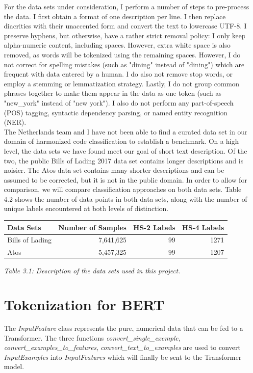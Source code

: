 For the data sets under consideration, I perform a number of steps to pre-process the data. I first obtain a format of one description per line. 
I then replace diacritics with their unaccented form and convert the text to lowercase UTF-8. I preserve hyphens, but otherwise, have a rather strict removal policy: I only keep alpha-numeric content, including spaces. However, extra white space is also removed, as words will be tokenized using the remaining spaces. However, I do not correct for spelling mistakes (such as "dining" instead of "dining") which are frequent with data entered by a human. I do also not remove stop words, or employ a stemming or lemmatization strategy. 
Lastly, I do not group common phrases together to make them appear in the data as one token (such as "new{\_}york" instead of "new york"). I also do not perform any part-of-speech (POS) tagging, syntactic dependency parsing, or named entity recognition (NER).
\\

The Netherlands team and I have not been able to find a curated data set in our domain of harmonized code classification to establish a benchmark. On a high level, the data sets we have found meet our goal of short text description. Of the two, the public Bills of Lading 2017 data set contains longer descriptions and is noisier. The Atos data set contains many shorter descriptions and can be assumed to be corrected, but it is not in the public domain. In order to allow for comparison, we will compare classification approaches on both data sets. Table 4.2 shows the number of data points in both data sets, along with the number of unique labels encountered at both levels of distinction.

\begin{center}
    \begin{tabular}{lrrr} \hline
Data Sets & Number of Samples & HS-2 Labels & HS-4 Labels\\ \hline
Bills of Lading & 7,641,625 & 99 & 1271\\
Atos & 5,457,325 & 99 & 1207\\ \hline
	\end{tabular}
\end{center}
{\textit{Table 3.1: Description of the data sets used in this project.}} \\

\section{Tokenization for BERT}
The \textit{InputFeature} class represents the pure, numerical data that can be fed to a Transformer.
The three functions \textit{convert{\_}single{\_}exemple}, \textit{convert{\_}examples{\_}to{\_}features}, \textit{convert{\_}text{\_}to{\_}examples} are used to convert \textit{InputExamples} into \textit{InputFeatures} which will finally be sent to the Transformer model.\\


